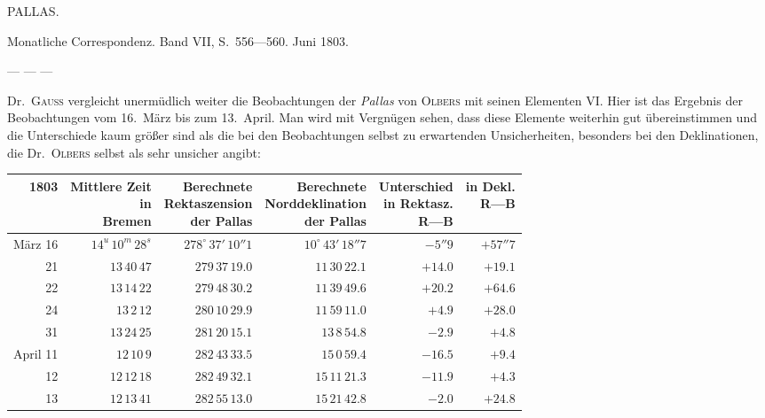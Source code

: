 \begin{center}
PALLAS.
\end{center}


Monatliche Correspondenz. Band VII, S.\ 556—560. Juni 1803.


— — —

Dr.\ \textsc{Gauß} vergleicht unermüdlich weiter die Beobachtungen der \emph{Pallas} von \textsc{Olbers} mit seinen Elementen VI. Hier ist das Ergebnis der Beobachtungen vom 16.\ März bis zum 13.\ April. Man wird mit Vergnügen sehen, dass diese Elemente weiterhin gut übereinstimmen und die Unterschiede kaum größer sind als die bei den Beobachtungen selbst zu erwartenden Unsicherheiten, besonders bei den Deklinationen, die Dr.\ \textsc{Olbers} selbst als sehr unsicher angibt:

\begin{center}
\begingroup\fontsize{8}{10}\selectfont\setlength{\tabcolsep}{3pt}\renewcommand{\arraystretch}{1.12}
\begin{tabular}{r|r|r|r|r|r}
1803 & \shortstack{Mittlere Zeit\\in\\Bremen} & \shortstack{Berechnete\\Rektaszension\\der Pallas} & \shortstack{Berechnete\\Norddeklination\\der Pallas} & \shortstack{Unterschied\\in Rektasz.\\R—B} & \shortstack{in Dekl.\\R—B} \\ \hline
März 16 & $14^u\,10^m\,28^s$ & $278^\circ\,37'\,10''1$ & $10^\circ\,43'\,18''7$ & $-5''9$ & $+57''7$ \\
21 & $13\,40\,47$ & $279\,37\,19.0$ & $11\,30\,22.1$ & $+14.0$ & $+19.1$ \\
22 & $13\,14\,22$ & $279\,48\,30.2$ & $11\,39\,49.6$ & $+20.2$ & $+64.6$ \\
24 & $13\,2\,12$ & $280\,10\,29.9$ & $11\,59\,11.0$ & $+4.9$ & $+28.0$ \\
31 & $13\,24\,25$ & $281\,20\,15.1$ & $13\,8\,54.8$ & $-2.9$ & $+4.8$ \\
April 11 & $12\,10\,9$ & $282\,43\,33.5$ & $15\,0\,59.4$ & $-16.5$ & $+9.4$ \\
12 & $12\,12\,18$ & $282\,49\,32.1$ & $15\,11\,21.3$ & $-11.9$ & $+4.3$ \\
13 & $12\,13\,41$ & $282\,55\,13.0$ & $15\,21\,42.8$ & $-2.0$ & $+24.8$ \\
\end{tabular}\endgroup
\end{center}

\begin{flushright}
\end{flushright}
